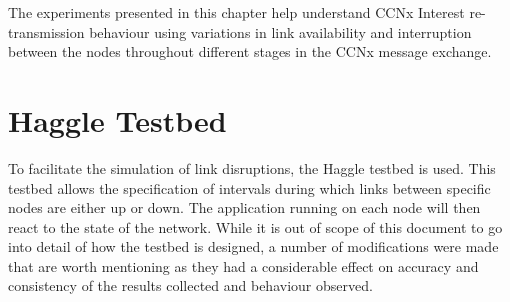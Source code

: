 \documentclass[a4paper,12pt]{report}      %
\begin{document}
The experiments presented in this chapter help understand CCNx Interest re-transmission behaviour using variations in link availability and interruption between the nodes throughout different stages in the CCNx message exchange.

\section{Haggle Testbed}

To facilitate the simulation of link disruptions, the Haggle testbed \cite{haggle} is used. 
This testbed allows the specification of intervals during which links between specific nodes are either up or down. The application running on each node will then react to the state of the network. While it is out of scope of this document to go into detail of how
the testbed is designed, a number of modifications were made that are worth mentioning as they had a considerable effect on accuracy and consistency of the results collected and behaviour observed.
\end{document}
